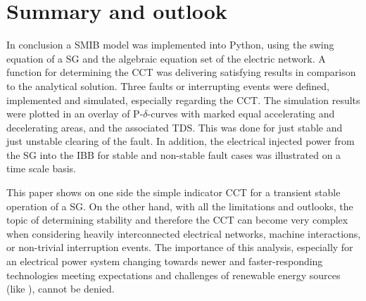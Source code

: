 
\chapter{Summary and outlook}
\label{chap:summary}


In conclusion a \acf{SMIB} model was implemented into Python, using the swing equation of a \acf{SG} and the algebraic equation set of the electric network. A function for determining the \acf{CCT} was delivering satisfying results in comparison to the analytical solution. Three faults or interrupting events were defined, implemented and simulated, especially regarding the \acs{CCT}. The simulation results were plotted in an overlay of P-$\delta$-curves with marked equal accelerating and decelerating areas, and the associated \acf{TDS}. This was done for just stable and just unstable clearing of the fault. In addition, the electrical injected power from the \acs{SG} into the \acf{IBB} for stable and non-stable fault cases was illustrated on a time scale basis.

This paper shows on one side the simple indicator \acs{CCT} for a transient stable operation of a \acs{SG}. On the other hand, with all the limitations and outlooks, the topic of determining stability and therefore the \acs{CCT} can become very complex when considering heavily interconnected electrical networks, machine interactions, or non-trivial interruption events. The importance of this analysis, especially for an electrical power system changing towards newer and faster-responding technologies meeting expectations and challenges of renewable energy sources (like \textcite{gaoTransientStabilityAnalysis2024}), cannot be denied.